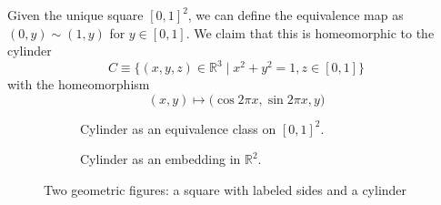     \begin{example}[Cylinder]
      Given the unique square $[0, 1]^2$, we can define the equivalence map as $(0, y) \sim (1, y)$ for $y \in [0, 1]$. We claim that this is homeomorphic to the cylinder 
      \begin{equation}
        C \equiv \{(x, y, z) \in \mathbb{R}^3 \mid x^2 + y^2 = 1, z \in [0,1]\} 
      \end{equation}
      with the homeomorphism 
      \begin{equation}
        (x, y) \mapsto \big( \cos{2\pi x}, \sin{2 \pi x}, y \big)
      \end{equation}

      \begin{figure}[H]
        \centering
        \begin{subfigure}[b]{0.48\textwidth}
          \centering
          \caption{Cylinder as an equivalence class on $[0, 1]^2$.}
          \label{fig:cylinder_equiv}
        \end{subfigure}
        \hfill 
        \begin{subfigure}[b]{0.48\textwidth}
          \centering
          \caption{Cylinder as an embedding in $\mathbb{R}^2$. }
          \label{fig:cylinder_embed}
        \end{subfigure}
        \caption{Two geometric figures: a square with labeled sides and a cylinder}
        \label{fig:cylinder}
      \end{figure}
    \end{example}

